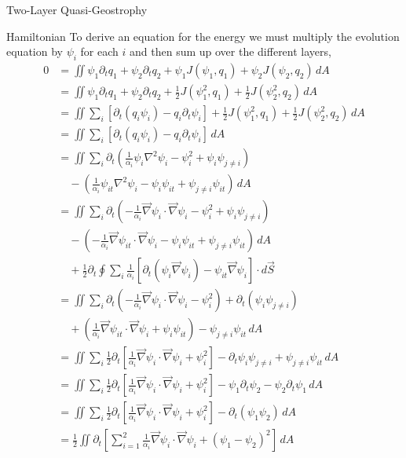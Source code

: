 \documentclass[12pt]{article}
\begin{document}
\begin{section}{Two-Layer Quasi-Geostrophy}
    \begin{subsection}{Hamiltonian}
        To derive an equation for the energy we must multiply the evolution equation by $\psi_i$ for each $i$ and then sum up over the different layers,
        \begin{align*}
            0 &= \iint \psi_1 \partial_t q_1 + \psi_2 \partial_t q_2 + \psi_1 J(\psi_1, q_1) + \psi_2 J(\psi_2, q_2) \, dA \\
            &= \iint \psi_1 \partial_t q_1 + \psi_2 \partial_t q_2 + \frac12 J(\psi_1^2, q_1) + \frac12 J(\psi_2^2, q_2) \, dA \\
            &= \iint \sum_i \left[\partial_t(q_i \psi_i) - q_i \partial_t\psi_i \right] + \frac12 J(\psi_1^2, q_1) + \frac12 J(\psi_2^2, q_2) \, dA \\
            &= \iint \sum_i \left[\partial_t(q_i \psi_i) - q_i \partial_t\psi_i \right] \, dA \\
            &= \iint \sum_i \partial_t \left (\frac{1}{\alpha_i}\psi_i \nabla^2 \psi_i - \psi_i^2 + \psi_i\psi_{j\ne i} \right) \\
            &\quad - \left( \frac{1}{\alpha_i} \psi_{it} \nabla^2 \psi_i - \psi_i \psi_{it} + \psi_{j \ne i} \psi_{it} \right) \, dA \\
            &= \iint \sum_i \partial_t \left (-\frac{1}{\alpha_i} \vec\nabla \psi_i \cdot \vec\nabla \psi_i - \psi_i^2 + \psi_i\psi_{j\ne i} \right) \\
            &\quad - \left( -\frac{1}{\alpha_i} \vec\nabla \psi_{it} \cdot \vec\nabla \psi_i - \psi_i \psi_{it} + \psi_{j \ne i} \psi_{it} \right) \, dA \\
            &\quad + \frac12 \partial_t \oint \sum_i \frac{1}{\alpha_i} \left[ \partial_t \left( \psi_i\vec\nabla\psi_i \right) - \psi_{it}\vec\nabla\psi_i\right] \cdot d\vec S \\
            &= \iint \sum_i \partial_t \left (-\frac{1}{\alpha_i} \vec\nabla \psi_i \cdot \vec\nabla \psi_i - \psi_i^2 \right) + \partial_t (\psi_i\psi_{j\ne i})  \\
            &\quad + \left( \frac{1}{\alpha_i} \vec\nabla \psi_{it} \cdot \vec\nabla \psi_i + \psi_i \psi_{it} \right) - \psi_{j \ne i} \psi_{it} \, dA \\
            &= \iint \sum_i \frac12 \partial_t \left[ \frac{1}{\alpha_i} \vec\nabla \psi_i \cdot \vec\nabla \psi_i + \psi_i^2 \right] - \partial_t \psi_i\psi_{j\ne i} + \psi_{j \ne i} \psi_{it} \, dA \\
            &= \iint  \sum_i \frac12 \partial_t \left[ \frac{1}{\alpha_i} \vec\nabla \psi_i \cdot  \vec\nabla \psi_i + \psi_i^2 \right] - \psi_1 \partial_t \psi_2  -  \psi_2 \partial_t \psi_1\, dA \\
            &= \iint  \sum_i \frac12 \partial_t \left[ \frac{1}{\alpha_i} \vec\nabla \psi_i \cdot  \vec\nabla \psi_i + \psi_i^2 \right] -  \partial_t (\psi_1\psi_2)\, dA \\
            &= \frac12 \iint \partial_t \left[ \sum_{i=1}^2 \frac{1}{\alpha_i} \vec\nabla \psi_i \cdot \vec\nabla \psi_i + (\psi_1 - \psi_2)^2 \right]\, dA
        \end{align*}


\end{subsection}
\end{section}
\end{document}
